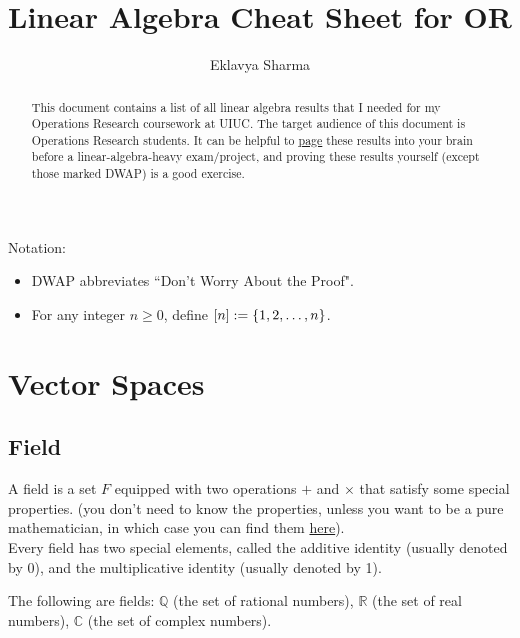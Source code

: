 \documentclass[a4paper,12pt,fleqn]{article}
\title{Linear Algebra Cheat Sheet for OR}
\author{Eklavya Sharma}
\date{\empty}
\newcommand*{\thmdepurl}[1]{https://sharmaeklavya2.github.io/theoremdep/nodes#1}
\newcommand*{\thmdephref}[2]{\href{\thmdepurl{#1}}{#2}}
\newenvironment*{tightemize}{\begin{itemize}[noitemsep]}{\end{itemize}}
\begin{document}
\maketitle

\begin{abstract}
This document contains a list of all linear algebra results
that I needed for my Operations Research coursework at UIUC.
The target audience of this document is Operations Research students.
It can be helpful to \href{https://en.wikipedia.org/wiki/Memory_paging}{page}
these results into your brain before a linear-algebra-heavy exam/project,
and proving these results yourself (except those marked DWAP) is a good exercise.
\end{abstract}

\setlength{\parskip}{0.5em}

Notation:
\begin{tightemize}
\item DWAP abbreviates ``Don't Worry About the Proof".
\item For any integer $n \ge 0$, define $[n] := \{1, 2, \ldots, n\}$.
\end{tightemize}

\tableofcontents

\section{Vector Spaces}
\label{sec:vector-space}

\subsection{Field}

\begin{definition}[Field]
A field is a set $F$ equipped with two operations $+$ and $\times$ that satisfy some special properties.
(you don't need to know the properties, unless you want to be a pure mathematician,
in which case you can find them \thmdephref{/abstract-algebra/rings/field.html}{here}).
\\ Every field has two special elements, called the additive identity (usually denoted by 0),
and the multiplicative identity (usually denoted by 1).
\end{definition}

\begin{theorem}[DWAP]
The following are fields:
$\mathbb{Q}$ (the set of rational numbers),
$\mathbb{R}$ (the set of real numbers),
$\mathbb{C}$ (the set of complex numbers).
\end{theorem}
\end{document}
